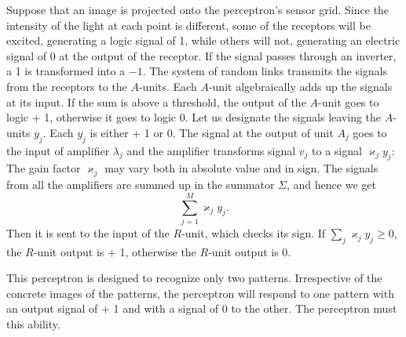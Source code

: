 Suppose that an image is projected onto the perceptron's sensor grid.
Since the intensity of the light at each point is different, some of the
receptors will be excited, generating a logic signal of 1, while others will
not, generating an electric signal of 0 at the output of the receptor. If the
signal passes through an inverter, a 1 is transformed into a $-1$. The
system of random links transmits the signals from the receptors to the
$A$-units. Each $A$-unit algebraically adds up the signals at its input. If the
sum is above a threshold, the output of the $A$-unit goes to logic + 1,
otherwise it goes to logic 0. Let us designate the signals leaving the
$A$-units $y_{j}$. Each $y_{j}$ is either + 1 or 0. The signal at the output of unit $A_{j}$ goes to the input of amplifier $\lambda_{j}$ and the amplifier transforms signal $v_{j}$ to a signal $\varkappa_{j} y_{j}$: The gain factor $\varkappa_{j}$ may vary both in absolute value and in sign. The signals from all the amplifiers are summed up in the summator $\Sigma$, and hence we get 
\begin{equation*}%
\sum_{j= 1}^{M} \varkappa_{j} y_{j}.
\end{equation*}
Then it is sent to the input of the $R$-unit, which checks its sign. If
$\sum_{j} \varkappa_{j} y_{j} \geqslant 0$, the $R$-unit output is + 1, otherwise the $R$-unit output is 0.

This perceptron is designed to recognize only two patterns.
Irrespective of the concrete images of the patterns, the perceptron will
respond to one pattern with an output signal of + 1 and with a signal
of 0 to the other. The perceptron must  this ability.

